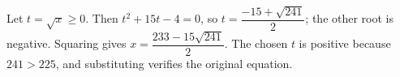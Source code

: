 Let $t=\sqrt{x}\ge0$. Then $t^2+15t-4=0$, so $t=\dfrac{-15+\sqrt{241}}{2}$; the other root is negative. Squaring gives $\boxed{x=\dfrac{233-15\sqrt{241}}{2}}$. The chosen $t$ is positive because $241>225$, and substituting verifies the original equation.
